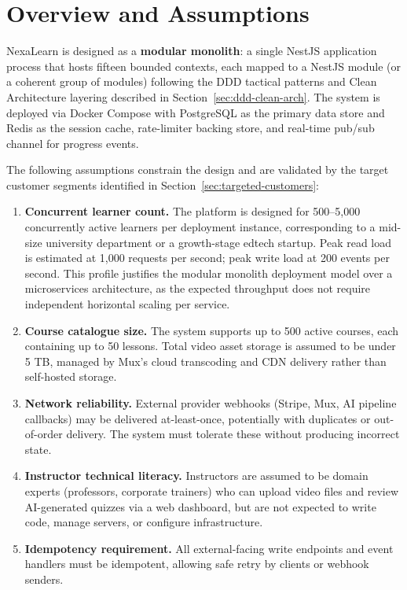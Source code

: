 
\section{Overview and Assumptions}
\label{sec:overview-assumptions}

NexaLearn is designed as a \textbf{modular monolith}: a single NestJS application process that hosts fifteen bounded contexts, each mapped to a NestJS module (or a coherent group of modules) following the DDD tactical patterns and Clean Architecture layering described in Section~\ref{sec:ddd-clean-arch}. The system is deployed via Docker Compose with PostgreSQL as the primary data store and Redis as the session cache, rate-limiter backing store, and real-time pub/sub channel for progress events.

The following assumptions constrain the design and are validated by the target customer segments identified in Section~\ref{sec:targeted-customers}:

\begin{enumerate}
  \item \textbf{Concurrent learner count.} The platform is designed for 500--5,000 concurrently active learners per deployment instance, corresponding to a mid-size university department or a growth-stage edtech startup. Peak read load is estimated at 1,000 requests per second; peak write load at 200 events per second. This profile justifies the modular monolith deployment model over a microservices architecture, as the expected throughput does not require independent horizontal scaling per service.
  \item \textbf{Course catalogue size.} The system supports up to 500 active courses, each containing up to 50 lessons. Total video asset storage is assumed to be under 5 TB, managed by Mux's cloud transcoding and CDN delivery rather than self-hosted storage.
  \item \textbf{Network reliability.} External provider webhooks (Stripe, Mux, AI pipeline callbacks) may be delivered at-least-once, potentially with duplicates or out-of-order delivery. The system must tolerate these without producing incorrect state.
  \item \textbf{Instructor technical literacy.} Instructors are assumed to be domain experts (professors, corporate trainers) who can upload video files and review AI-generated quizzes via a web dashboard, but are not expected to write code, manage servers, or configure infrastructure.
  \item \textbf{Idempotency requirement.} All external-facing write endpoints and event handlers must be idempotent, allowing safe retry by clients or webhook senders.
\end{enumerate}

